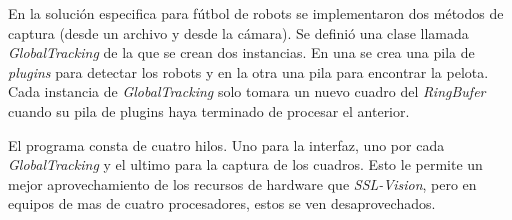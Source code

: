 En la solución especifica para fútbol de robots se implementaron dos métodos de
captura (desde un archivo y desde la cámara). Se definió una clase llamada
\emph{GlobalTracking} de la que se crean dos instancias. En una se crea una pila
de \emph{plugins} para detectar los robots y en la otra una pila para encontrar
la pelota. Cada instancia de \emph{GlobalTracking} solo tomara un nuevo cuadro
del \emph{RingBufer} cuando su pila de plugins haya terminado de procesar el
anterior.

El programa consta de cuatro hilos. Uno para la interfaz, uno por cada
\emph{GlobalTracking} y el ultimo para la captura de los cuadros. Esto le
permite un mejor aprovechamiento de los recursos de hardware que
\emph{SSL-Vision}, pero en equipos de mas de cuatro procesadores, estos se ven
desaprovechados.


